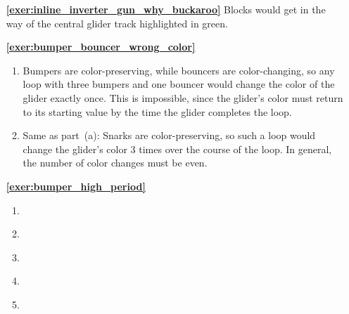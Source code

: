 \begin{multicols}{2}
	\begin{itemize}[leftmargin=0em]
		\item[\bf\color{ocre}\sffamily\ref{exer:inline_inverter_gun_why_buckaroo}] Blocks would get in the way of the central glider track highlighted in green.\\
		
		
		\item[\bf\color{ocre}\sffamily\ref{exer:bumper_bouncer_wrong_color}]
		\begin{enumerate}[leftmargin=1.5em,label=\bf\color{ocre}(\alph*)]
			\item Bumpers are color-preserving, while bouncers are color-changing, so any loop with three bumpers and one bouncer would change the color of the glider exactly once. This is impossible, since the glider's color must return to its starting value by the time the glider completes the loop.
			
			\item Same as part~(a): Snarks are color-preserving, so such a loop would change the glider's color 3 times over the course of the loop. In general, the number of color changes must be even.\\
		\end{enumerate}
		
		
		\item[\bf\color{ocre}\sffamily\ref{exer:bumper_high_period}]
		\begin{enumerate}[leftmargin=1.5em,label=\bf\color{ocre}(\alph*)]
			\item {} \\
			
			\item {} \\
			
			\item {} \\
			
			\item {} \\
			
			\item {} \\
		\end{enumerate}
	


\end{itemize}
\end{multicols}
